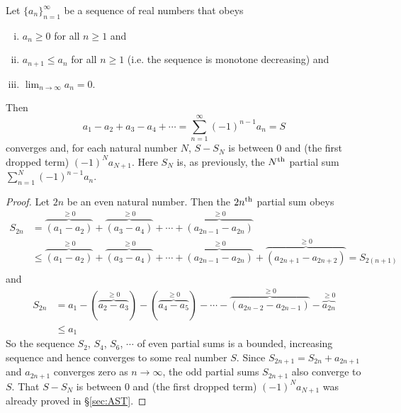\begingroup
\def\thetheorem{\ref{thm:SRalternating}}
\begin{theorem}
 Let $\big\{a_n\big\}_{n=1}^\infty$
be a sequence of real numbers that obeys
\begin{enumerate}[(i)]\itemsep1pt \parskip0pt  %
\item $a_n\ge 0$ for all $n\ge 1$ and
\item $a_{n+1}\le a_n$  for all $n\ge 1$ (i.e. the
sequence is monotone decreasing) and
\item $\lim_{n\rightarrow\infty}a_n=0$.
\end{enumerate}
Then
\begin{equation*}
a_1-a_2+a_3-a_4+\cdots=\sum\limits_{n=1}^\infty (-1)^{n-1} a_n =S
\end{equation*}
converges and, for each natural number $N$,  $S-S_N$ is between $0$ and (the
first dropped term) $(-1)^N a_{N+1}$. Here $S_N$ is, as previously,
the $N^{\rm th}$ partial sum $\sum\limits_{n=1}^N (-1)^{n-1} a_n$.
\end{theorem}
\addtocounter{theorem}{-1}
\endgroup

\begin{proof}
Let $2n$ be an even natural number. Then the $2n^{\rm th}$ partial sum
obeys
\begin{align*}
S_{2n}&=\overbrace{(a_1-a_2)}^{\ge 0}
                +\overbrace{(a_3-a_4)}^{\ge 0}+\cdots
                +\overbrace{(a_{2n-1}-a_{2n})}^{\ge 0} \\
&\le\overbrace{(a_1-a_2)}^{\ge 0}
                +\overbrace{(a_3-a_4)}^{\ge 0}+\cdots
                +\overbrace{(a_{2n-1}-a_{2n})}^{\ge 0}
                +\overbrace{(a_{2n+1}-a_{2n+2})}^{\ge 0}
  =S_{2(n+1)} \\
\end{align*}
and
\begin{align*}
S_{2n}&=a_1-(\overbrace{a_2-a_3}^{\ge 0})
                         -(\overbrace{a_4-a_5}^{\ge 0})-\cdots
                         -\overbrace{(a_{2n-2}-a_{2n-1})}^{\ge 0}
                         -\overbrace{a_{2n}}^{\ge 0} \\
      &\le a_1
\end{align*}
So the sequence $S_2$, $S_4$, $S_6$, $\cdots$ of even partial sums
is a bounded, increasing sequence and hence converges to some real
number $S$. Since $S_{2n+1} = S_{2n} +a_{2n+1}$ and $a_{2n+1}$
converges zero as $n\rightarrow\infty$, the odd partial sums $S_{2n+1}$
also converge to $S$. That $S-S_N$ is between $0$ and (the
first dropped term) $(-1)^N a_{N+1}$ was already proved
in \S\ref{sec:AST}.
\end{proof}

